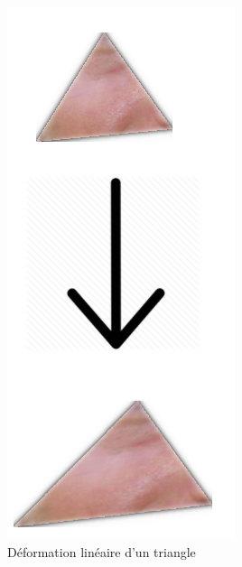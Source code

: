 \documentclass[a4paper,french]{article}
\begin{document}
\begin{figure}[H]
    \centering
    \includegraphics[scale=0.5]{figures/lin_deforma.png}
    \caption{Déformation linéaire d'un triangle}
    \label{fig:Lin_deforma}
\end{figure}
\end{document}
